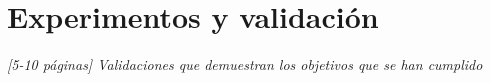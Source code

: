 \chapter{Experimentos y validación}
\label{chap:validacion}

\textit{[5-10 páginas] Validaciones que demuestran los objetivos que se han cumplido}

